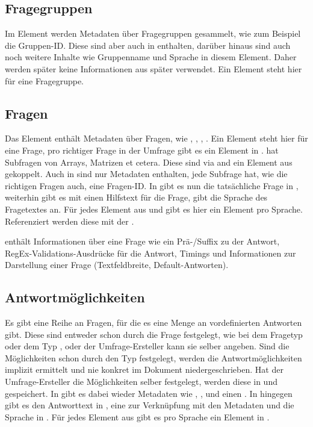 \subsection{Fragegruppen}

Im Element  werden Metadaten über Fragegruppen gesammelt, wie zum Beispiel die Gruppen-ID.
Diese sind aber auch in  enthalten, darüber hinaus sind auch noch weitere Inhalte wie Gruppenname und Sprache in diesem Element.
Daher werden später keine Informationen aus  später verwendet.
Ein  Element steht hier für eine Fragegruppe.

\subsection{Fragen}

Das Element  enthält Metadaten über Fragen, wie , , , .
Ein  Element steht hier für eine Frage, pro richtiger Frage in der Umfrage gibt es ein Element in .
 hat Subfragen von Arrays, Matrizen et cetera. Diese sind via  and ein Element aus  gekoppelt.
Auch in  sind nur Metadaten enthalten, jede Subfrage hat, wie die richtigen Fragen auch, eine Fragen-ID.
In  gibt es nun die tatsächliche Frage in , weiterhin gibt es mit  einen Hilfstext für die Frage,  gibt die Sprache des Fragetextes an.
Für jedes Element aus  und  gibt es hier ein Element pro Sprache.
Referenziert werden diese mit der .

 enthält Informationen über eine Frage wie ein Prä-/Suffix zu der Antwort, RegEx-Validations-Ausdrücke für die Antwort, Timings und Informationen zur Darstellung einer Frage (Textfeldbreite, Default-Antworten).

\subsection{Antwortmöglichkeiten}

Es gibt eine Reihe an Fragen, für die es eine Menge an vordefinierten Antworten gibt.
Diese sind entweder schon durch die Frage festgelegt, wie bei dem Fragetyp  oder dem Typ , oder der Umfrage-Ersteller kann sie selber angeben.
Sind die Möglichkeiten schon durch den Typ festgelegt, werden die Antwortmöglichkeiten implizit ermittelt und nie konkret im Dokument niedergeschrieben.
Hat der Umfrage-Ersteller die Möglichkeiten selber festgelegt, werden diese in  und  gespeichert.
In  gibt es dabei wieder Metadaten wie , , und einen . 
In  hingegen gibt es den Antworttext in , eine  zur Verknüpfung mit den Metadaten und die Sprache in .
Für jedes Element aus  gibt es pro Sprache ein Element in .

